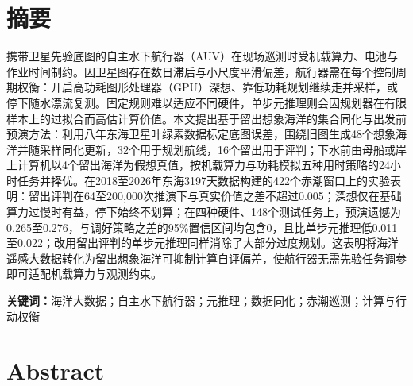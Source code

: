\section*{摘\quad 要}

携带卫星先验底图的自主水下航行器（AUV）在现场巡测时受机载算力、电池与作业时间制约。因卫星图存在数日滞后与小尺度平滑偏差，航行器需在每个控制周期权衡：开启高功耗图形处理器（GPU）深想、靠低功耗规划继续走并采样，或停下随水漂流复测。固定规则难以适应不同硬件，单步元推理则会因规划器在有限样本上的过拟合而高估计算价值。本文提出基于留出想象海洋的集合同化与出发前预演方法：利用八年东海卫星叶绿素数据标定底图误差，围绕旧图生成48个想象海洋并随采样同化更新，32个用于规划航线，16个留出用于评判；下水前由母船或岸上计算机以4个留出海洋为假想真值，按机载算力与功耗模拟五种用时策略的24小时任务并择优。在2018至2026年东海3197天数据构建的422个赤潮窗口上的实验表明：留出评判在64至200,000次推演下与真实价值之差不超过0.005；深想仅在基础算力过慢时有益，停下始终不划算；在四种硬件、148个测试任务上，预演遗憾为0.265至0.276，与调好策略之差的95\%置信区间均包含0，且比单步元推理低0.011至0.022；改用留出评判的单步元推理同样消除了大部分过度规划。这表明将海洋遥感大数据转化为留出想象海洋可抑制计算自评偏差，使航行器无需先验任务调参即可适配机载算力与观测约束。

\vspace{1em}
\noindent\textbf{关键词：}海洋大数据；自主水下航行器；元推理；数据同化；赤潮巡测；计算与行动权衡

\clearpage
\section*{Abstract}


